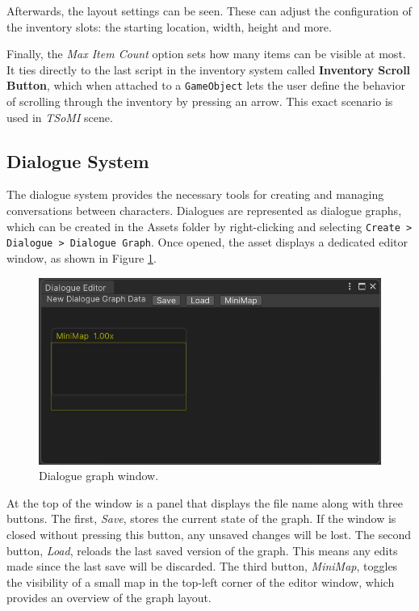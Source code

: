 Afterwards, the layout settings can be seen. These can adjust the configuration of the inventory slots: the starting location, width, height and more. 

Finally, the \textit{Max Item Count} option sets how many items can be visible at most. It ties directly to the last script in the inventory system called \textbf{Inventory Scroll Button}, which when attached to a \verb|GameObject| lets the user define the behavior of scrolling through the inventory by pressing an arrow. This exact scenario is used in \textit{TSoMI} scene.

\subsection{Dialogue System}
The dialogue system provides the necessary tools for creating and managing conversations between characters. Dialogues are represented as dialogue graphs, which can be created in the Assets folder by right-clicking and selecting \verb|Create > Dialogue > Dialogue Graph|. Once opened, the asset displays a dedicated editor window, as shown in Figure \ref{fig:Manual-DW}.

\begin{figure}[H]
\centering
\includegraphics[width=0.8\linewidth]{img/User doc/image_2025-07-04_123651622.png}
\caption{Dialogue graph window.}
\label{fig:Manual-DW}
\end{figure}

At the top of the window is a panel that displays the file name along with three buttons. The first, \textit{Save}, stores the current state of the graph. If the window is closed without pressing this button, any unsaved changes will be lost. The second button, \textit{Load}, reloads the last saved version of the graph. This means any edits made since the last save will be discarded. The third button, \textit{MiniMap}, toggles the visibility of a small map in the top-left corner of the editor window, which provides an overview of the graph layout.

